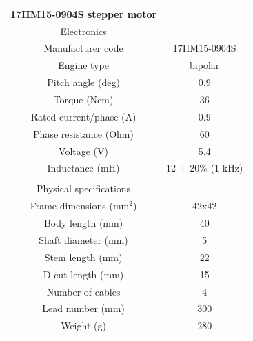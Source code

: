 \documentclass{article}
\begin{document}
\begin{multicols}{2}
        \begin{minipage}{0.5\textwidth}
            \centering
            \begin{tabular}{cc}
                \textbf{17HM15-0904S stepper motor}&\\
                Electronics&\\
                \hline
                Manufacturer code & 17HM15-0904S\\
                Engine type & bipolar\\
                Pitch angle (deg) & 0.9 \\
                Torque (Ncm)& 36\\
                Rated current/phase (A) & 0.9\\
                Phase resistance (Ohm)& 60\\
                Voltage (V)& 5.4\\
                Inductance (mH)& 12 \(\pm\) 20\% (1 kHz)\\
                 & \\
                Physical specifications&\\
                \hline
                Frame dimensions (mm\(^2\))& 42x42 \\
                Body length (mm)& 40 \\
                Shaft diameter (mm)& 5 \\
                Stem length (mm)& 22 \\
                D-cut length (mm)& 15 \\
                Number of cables & 4\\
                Lead number (mm)& 300 \\
                Weight (g) & 280\\
                \hline
            \end{tabular}
            \label{tab:nema_17_specifics}
        \end{minipage}

        

\end{multicols}
\end{document}
